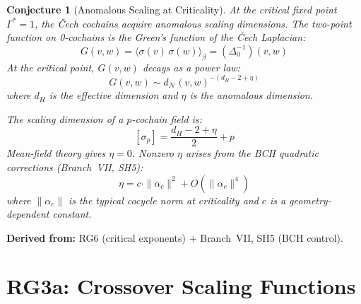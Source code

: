 \documentclass[11pt,letterpaper]{article}
\newtheorem{conjecture}{Conjecture}[section]
\newcommand{\nerve}{\mathcal{N}}
\begin{document}
\begin{conjecture}[Anomalous Scaling at 
Criticality]\label{conj:anomalous}
At the critical fixed point $\Gamma^* = 1$, the \v{C}ech cochains 
acquire \emph{anomalous scaling dimensions}. The two-point 
function on 0-cochains is the Green's function of the \v{C}ech 
Laplacian:
\begin{equation}\label{eq:green}
    G(v, w) = \langle \sigma(v) \, \sigma(w) \rangle_\beta 
    = (\Delta_0^{-1})(v, w)
\end{equation}
At the critical point, $G(v, w)$ decays as a power law:
\begin{equation}\label{eq:anomalous}
    G(v, w) \sim d_\nerve(v, w)^{-(d_H - 2 + \eta)}
\end{equation}
where $d_H$ is the effective dimension and $\eta$ is the anomalous 
dimension.

The scaling dimension of a $p$-cochain field is:
\begin{equation}\label{eq:cochain_dimension}
    [\sigma_p] = \frac{d_H - 2 + \eta}{2} + p
\end{equation}
Mean-field theory gives $\eta = 0$. Nonzero $\eta$ arises from 
the BCH quadratic corrections (Branch~VII, SH5):
\begin{equation}\label{eq:eta_bch}
    \eta = c \cdot \|\alpha_c\|^2 + O(\|\alpha_c\|^4)
\end{equation}
where $\|\alpha_c\|$ is the typical cocycle norm at criticality 
and $c$ is a geometry-dependent constant.
\end{conjecture}

\textbf{Derived from:} RG6 (critical exponents) + Branch~VII, SH5 
(BCH control).

\section{RG3a: Crossover Scaling Functions}
\end{document}
